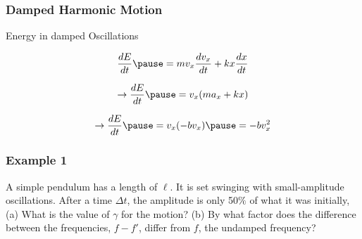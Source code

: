 \documentclass[]{beamer}
\begin{document}
\begin{frame}
  \frametitle{Damped Harmonic Motion}
  
  \textcolor{mypink1}{Energy in damped Oscillations}
  
  \pause

  \begin{equation*}
    \frac{dE}{dt}   \pause =mv_x\frac{dv_x}{dt}+kx\frac{dx}{dt}
  \end{equation*}
  \pause

  \begin{equation*}
    \rightarrow \frac{dE}{dt}   \pause =v_x(ma_x+kx)
  \end{equation*}
  

  \pause

  \begin{equation*}
    \rightarrow \frac{dE}{dt}   \pause =v_x(-b v_x)\pause =-b v_x^2
  \end{equation*}

  \end{frame}
  




\begin{frame}
\frametitle{Example 1}



A simple pendulum has a length of $\ell$. It is set swinging with small-amplitude oscillations.
After a time $\Delta t$, the amplitude is only 50$\%$ of what it was initially, (a) What is
the value of $\gamma$ for the motion? (b) By what factor does the difference between the frequencies, $f-f'$, differ
from $f$, the undamped frequency?



\end{frame}

\end{document}

